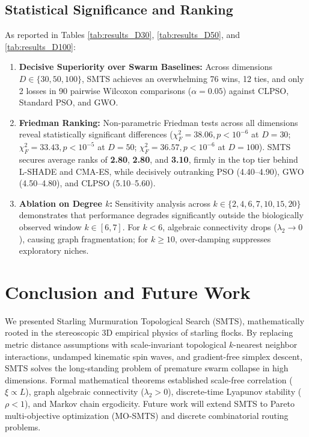 \documentclass[journal]{IEEEtran}
\begin{document}
\subsection{Statistical Significance and Ranking}
As reported in Tables \ref{tab:results_D30}, \ref{tab:results_D50}, and \ref{tab:results_D100}:
\begin{enumerate}
    \item \textbf{Decisive Superiority over Swarm Baselines:} Across dimensions $D \in \{30, 50, 100\}$, SMTS achieves an overwhelming 76 wins, 12 ties, and only 2 losses in 90 pairwise Wilcoxon comparisons ($\alpha = 0.05$) against CLPSO, Standard PSO, and GWO.
    \item \textbf{Friedman Ranking:} Non-parametric Friedman tests across all dimensions reveal statistically significant differences ($\chi_F^2 = 38.06, p < 10^{-6}$ at $D=30$; $\chi_F^2 = 33.43, p < 10^{-5}$ at $D=50$; $\chi_F^2 = 36.57, p < 10^{-6}$ at $D=100$). SMTS secures average ranks of \textbf{2.80}, \textbf{2.80}, and \textbf{3.10}, firmly in the top tier behind L-SHADE and CMA-ES, while decisively outranking PSO (4.40--4.90), GWO (4.50--4.80), and CLPSO (5.10--5.60).
    \item \textbf{Ablation on Degree $k$:} Sensitivity analysis across $k \in \{2, 4, 6, 7, 10, 15, 20\}$ demonstrates that performance degrades significantly outside the biologically observed window $k \in [6, 7]$. For $k < 6$, algebraic connectivity drops ($\lambda_2 \to 0$), causing graph fragmentation; for $k \ge 10$, over-damping suppresses exploratory niches.
\end{enumerate}

\section{Conclusion and Future Work}
We presented Starling Murmuration Topological Search (SMTS), mathematically rooted in the stereoscopic 3D empirical physics of starling flocks. By replacing metric distance assumptions with scale-invariant topological $k$-nearest neighbor interactions, undamped kinematic spin waves, and gradient-free simplex descent, SMTS solves the long-standing problem of premature swarm collapse in high dimensions. Formal mathematical theorems established scale-free correlation ($\xi \propto L$), graph algebraic connectivity ($\lambda_2 > 0$), discrete-time Lyapunov stability ($\rho < 1$), and Markov chain ergodicity. Future work will extend SMTS to Pareto multi-objective optimization (MO-SMTS) and discrete combinatorial routing problems.



\end{document}
